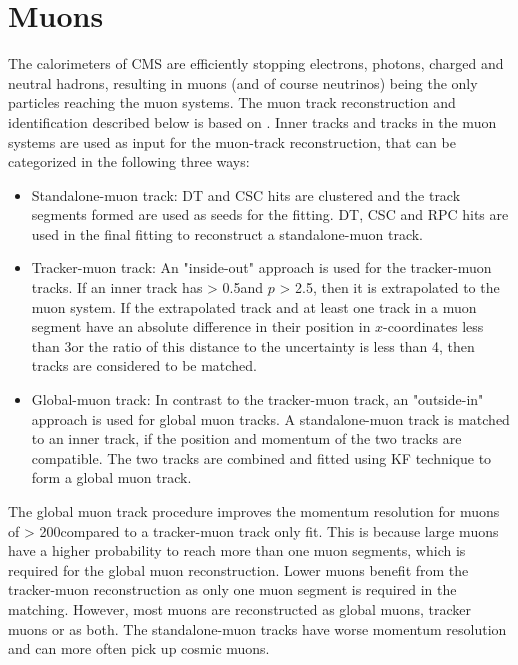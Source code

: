 \section{Muons}\label{sec:muons}
The calorimeters of CMS are efficiently stopping electrons, photons, charged and neutral hadrons, resulting in muons (and of course neutrinos) being the only particles reaching the muon systems.  
The muon track reconstruction and identification described below is based on \cite{Sirunyan:2018fpa}. 
Inner tracks and tracks in the muon systems are used as input for the muon-track reconstruction, that can be categorized in the following three ways:
\begin{itemize}\addtolength{\itemsep}{0.5\baselineskip}
\item Standalone-muon track:
DT and CSC hits are clustered and the track segments formed are used as seeds for the fitting. DT, CSC and RPC hits are used in the final fitting to reconstruct a standalone-muon track.
\item Tracker-muon track:
An "inside-out" approach is used for the tracker-muon tracks. 
If an inner track has \pt > 0.5\GeV and $p$ > 2.5\GeV, then it is extrapolated to the muon system. 
If the extrapolated track and at least one track in a muon segment have an absolute difference in their position in $x$-coordinates less than 3\cm or the ratio of this distance to the uncertainty is less than 4, then tracks are considered to be matched.  
\item Global-muon track:
In contrast to the tracker-muon track, an "outside-in" approach is used for global muon tracks. 
A standalone-muon track is matched to an inner track, if the position and momentum of the two tracks are compatible. 
The two tracks are combined and fitted using KF technique to form a global muon track. 
\end{itemize}
The global muon track procedure improves the momentum resolution for muons of \pt > 200\GeV compared to a tracker-muon track only fit. 
This is because large \pt muons have a higher probability to reach more than one muon segments, which is required for the global muon reconstruction. 
Lower \pt muons benefit from the tracker-muon reconstruction as only one muon segment is required in the matching. 
However, most muons are reconstructed as global muons, tracker muons or as both. The standalone-muon tracks have worse momentum resolution and can more often pick up cosmic muons. 

